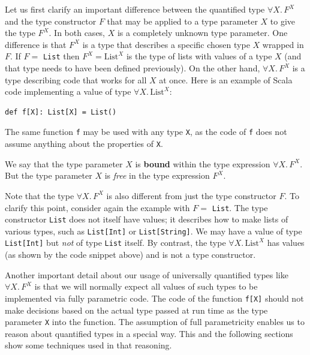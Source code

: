 Let us first clarify an important difference between the quantified
type $\forall X.\,F^{X}$ and the type constructor $F$ that may be
applied to a type parameter $X$ to give the type $F^{X}$. In both
cases, $X$ is a completely unknown type parameter. One difference
is that $F^{X}$ is a type that describes a specific chosen type $X$
wrapped in $F$. If $F=$ \lstinline!List! then $F^{X}=\text{List}^{X}$
is the type of lists with values of a type $X$ (and that type needs
to have been defined previously). On the other hand, $\forall X.\,F^{X}$
is a type describing code that works for all $X$ at once. Here is
an example of Scala code implementing a value of type $\forall X.\,\text{List}^{X}$:
\begin{lstlisting}
def f[X]: List[X] = List()
\end{lstlisting}
The same function \lstinline!f! may be used with any type \lstinline!X!,
as the code of \lstinline!f! does not assume anything about the properties
of \lstinline!X!. 

We say that the type parameter $X$ is \textbf{bound}
within the type expression $\forall X.\,F^{X}$. But the type parameter
$X$ is \emph{free} in the type expression
$F^{X}$.

Note that the type $\forall X.\,F^{X}$ is also different from just
the type constructor $F$. To clarify this point, consider again the
example with $F=$ \lstinline!List!. The type constructor \lstinline!List!
does not itself have values; it describes how to make lists of various
types, such as \lstinline!List[Int]! or \lstinline!List[String]!.
We may have a value of type \lstinline!List[Int]! but \emph{not}
of type \lstinline!List! itself. By contrast, the type $\forall X.\,\text{List}^{X}$
has values (as shown by the code snippet above) and is not a type
constructor.

Another important detail about our usage of universally quantified
types like $\forall X.\,F^{X}$ is that we will normally expect all
values of such types to be implemented via fully parametric code.
The code of the function \lstinline!f[X]! should not make decisions
based on the actual type passed at run time as the type parameter
\lstinline!X! into the function. The assumption of full parametricity
enables us to reason about quantified types in a special way. This
and the following sections show some techniques used in that reasoning.

